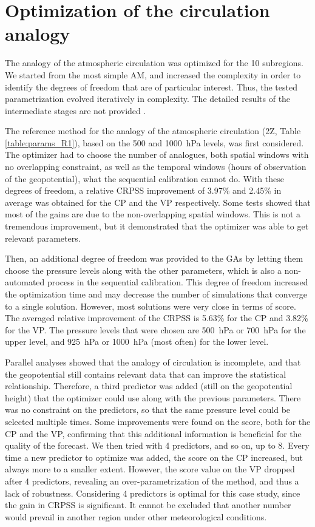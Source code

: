 \documentclass[5p]{elsarticle}
\begin{document}
\section{Optimization of the circulation analogy}
\label{sec:optim_circul}

The analogy of the atmospheric circulation was optimized for the 10 subregions. We started from the most simple AM, and increased the complexity in order to identify the degrees of freedom that are of particular interest. Thus, the tested parametrization evolved iteratively in complexity. The detailed results of the intermediate stages are not provided \citep[see][for the details]{Horton2012a}.

The reference method for the analogy of the atmospheric circulation (2Z, Table \ref{table:params_R1}), based on the 500 and 1000~hPa levels, was first considered. The optimizer had to choose the number of analogues, both spatial windows with no overlapping constraint, as well as the temporal windows (hours of observation of the geopotential), what the sequential calibration cannot do. With these degrees of freedom, a relative CRPSS improvement of 3.97\% and 2.45\% in average was obtained for the CP and the VP respectively. Some tests showed that most of the gains are due to the non-overlapping spatial windows. This is not a tremendous improvement, but it demonstrated that the optimizer was able to get relevant parameters.

Then, an additional degree of freedom was provided to the GAs by letting them choose the pressure levels along with the other parameters, which is also a non-automated process in the sequential calibration. This degree of freedom increased the optimization time and may decrease the number of simulations that converge to a single solution. However, most solutions were very close in terms of score. The averaged relative improvement of the CRPSS is 5.63\% for the CP and 3.82\% for the VP. The pressure levels that were chosen are 500~hPa or 700~hPa for the upper level, and 925~hPa or 1000~hPa (most often) for the lower level.

Parallel analyses showed that the analogy of circulation is incomplete, and that the geopotential still contains relevant data that can improve the statistical relationship. Therefore, a third predictor was added (still on the geopotential height) that the optimizer could use along with the previous parameters. There was no constraint on the predictors, so that the same pressure level could be selected multiple times. Some improvements were found on the score, both for the CP and the VP, confirming that this additional information is beneficial for the quality of the forecast. We then tried with 4 predictors, and so on, up to 8. Every time a new predictor to optimize was added, the score on the CP increased, but always more to a smaller extent. However, the score value on the VP dropped after 4 predictors, revealing an over-parametrization of the method, and thus a lack of robustness. Considering 4 predictors is optimal for this case study, since the gain in CRPSS is significant. It cannot be excluded that another number would prevail in another region under other meteorological conditions.
\end{document}
